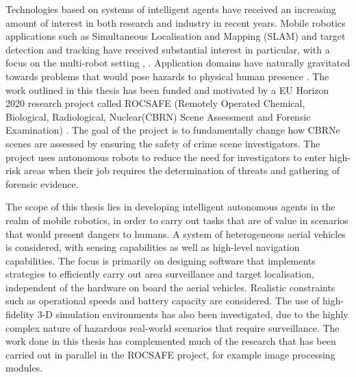 
Technologies based on systems of intelligent agents have received an increasing amount of interest in both research and industry in recent years. Mobile robotics applications such as Simultaneous Localisation and Mapping (SLAM) \cite{Thrun:2005:ProbabilisticRobotics} and target detection and tracking have received substantial interest in particular, with a focus on the multi-robot setting \cite{Saeedi2016Multiple-RobotReview}, \cite{Robin2016Multi-robotSurvey}. 
Application domains have naturally gravitated towards problems that would pose hazards to physical human presence \cite{Muller2014ApplicationSurvey}. The work outlined in this thesis has been funded and motivated by a EU Horizon 2020 research project called ROCSAFE (Remotely Operated Chemical, Biological, Radiological, Nuclear(CBRN) Scene Assessment and Forensic Examination) \cite{Bagherzadeh2017ROCSAFE:Incidents}. The goal of the project is to fundamentally change how CBRNe scenes are assessed by ensuring the safety of crime scene investigators. The project uses autonomous robots to reduce the need for investigators to enter high-risk areas when their job requires the determination of threats and gathering of  forensic evidence.\par

The scope of this thesis lies in developing intelligent autonomous agents in the realm of mobile robotics, in order to carry out tasks that are of value in scenarios that would present dangers to humans. A system of heterogeneous aerial vehicles is considered, with sensing capabilities as well as high-level navigation capabilities. The focus is primarily on designing software that implements strategies to efficiently carry out area surveillance and target localisation, independent of the hardware on board the aerial vehicles. Realistic constraints such as operational speeds and battery capacity are considered. The use of high-fidelity 3-D simulation environments has also been investigated, due to the highly complex nature of hazardous real-world scenarios that require surveillance. The work done in this thesis has complemented much of the research that has been carried out in parallel in the ROCSAFE project, for example image processing modules.\par
